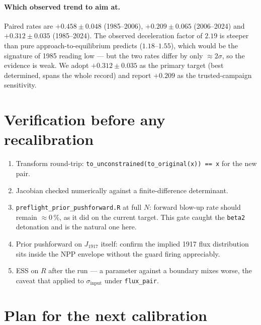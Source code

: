 \documentclass[11pt]{article}
\newcommand{\sinput}{\sigma_{\mathrm{input}}}
\begin{document}
\paragraph{Which observed trend to aim at.} Paired rates are $+0.458 \pm 0.048$ (1985--2006),
$+0.209 \pm 0.065$ (2006--2024) and $+0.312 \pm 0.035$ (1985--2024). The observed deceleration
factor of $2.19$ is steeper than pure approach-to-equilibrium predicts ($1.18$--$1.55$), which
would be the signature of 1985 reading low --- but the two rates differ by only $\approx 2\sigma$,
so the evidence is weak. We adopt $+0.312 \pm 0.035$ as the primary target (best determined,
spans the whole record) and report $+0.209$ as the trusted-campaign sensitivity.

\section{Verification before any recalibration}\label{sec:verify}

\begin{enumerate}
\item Transform round-trip: \texttt{to\_unconstrained(to\_original(x)) == x} for the new pair.
\item Jacobian checked numerically against a finite-difference determinant.
\item \texttt{preflight\_prior\_pushforward.R} at full $N$: forward blow-up rate should remain
$\approx 0\,\%$, as it did on the current target. This gate caught the \texttt{beta2} detonation
and is the natural one here.
\item Prior pushforward on $J_{1917}$ itself: confirm the implied 1917 flux distribution sits
inside the NPP envelope without the guard firing appreciably.
\item ESS on $R$ after the run --- a parameter against a boundary mixes worse, the caveat that
applied to $\sinput$ under \texttt{flux\_pair}.
\end{enumerate}

\section{Plan for the next calibration}
\end{document}
